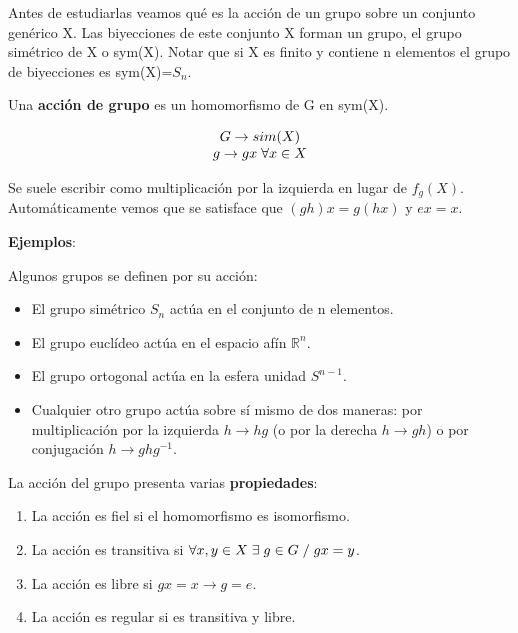 \documentclass{article}
\begin{document}
Antes de estudiarlas veamos qué es la acción de un grupo sobre un conjunto genérico X. Las biyecciones de este conjunto X forman un grupo, el grupo simétrico de X o sym(X). Notar que si X es finito y contiene n elementos el grupo de biyecciones es sym(X)=$S_n$.

\smallskip
Una \textbf{acción de grupo} es un homomorfismo de G en sym(X).

$$\begin{array}{c}
G \to sim(X)  \\
g\to gx \hspace{0.1cm} \forall x\in X
\end{array}$$

Se suele escribir como multiplicación por la izquierda en lugar de $f_g(X)$. Automáticamente vemos que se satisface que $(gh)x=g(hx)$ y $ex=x$.

\smallskip
\textbf{Ejemplos}:

\smallskip
Algunos grupos se definen por su acción:

\begin{itemize}
\item El grupo simétrico $S_n$ actúa en el conjunto de n elementos.
\item El grupo euclídeo actúa en el espacio afín $\mathds{R}^n$.
\item El grupo ortogonal actúa en la esfera unidad $S^{n-1}$.
\item Cualquier otro grupo actúa sobre sí mismo de dos maneras: por multiplicación por la izquierda $h\to hg$ (o por la derecha $h \to gh$) o por conjugación $h \to ghg^{-1}$.
\end{itemize}

La acción del grupo presenta varias \textbf{propiedades}:

\begin{enumerate}
\item La acción es fiel si el homomorfismo es isomorfismo.
\item La acción es transitiva si $\forall x,y\in X \hspace{0.1cm}\exists \hspace{0.1cm} g\in G \hspace{0.1cm}/ \hspace{0.1cm} gx=y$.
\item La acción es libre si $gx=x \to g=e$.
\item La acción es regular si es transitiva y libre.
\end{enumerate}
\end{document}
